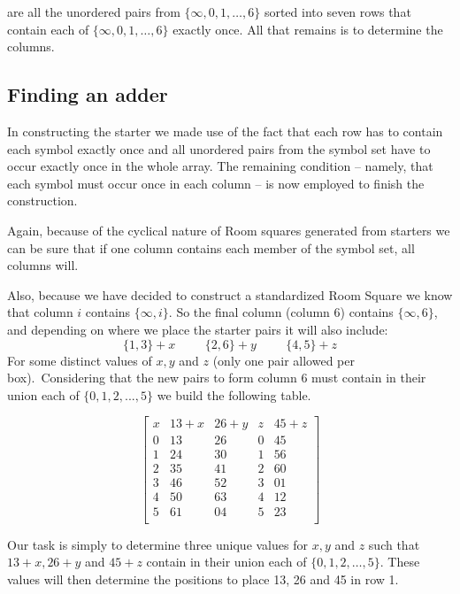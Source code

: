 \documentclass[11pt, a4paper]{book}\usepackage[]{graphicx}\usepackage[]{xcolor}
\begin{document}
are all the unordered pairs from $\{\infty, 0, 1, \ldots, 6\}$
sorted into seven rows that contain each of
$\{\infty, 0, 1, \ldots, 6\}$ exactly once. All that remains is to
determine the columns.

\subsection{Finding an adder}

In constructing the starter we made use of the fact that
each row has to contain each symbol exactly once and all
unordered pairs from the symbol set have to occur exactly
once in the whole array. The remaining condition – namely,
that each symbol must occur once in each column – is now
employed to finish the construction.

Again, because of the cyclical nature of Room squares
generated from starters we can be sure that if one column
contains each member of the symbol set, all columns will.

Also, because we have decided to construct a standardized
Room Square we know that column $i$ contains $\{\infty,i\}$.
So the final column (column 6) contains $\{\infty,6\}$, and
depending on where we place the starter pairs it will also
include: $$\{1,3\}+x \hspace{1cm} \{2,6\}+y \hspace{1cm}
\{4,5\}+z$$ For some distinct values of $x,y$ and $z$ (only
one pair allowed per box).\ Considering that the new pairs
to form column 6 must contain in their union each of
$\{0,1,2,...,5\}$ we build the following table.

\begin{equation}
  \begin{bmatrix}
    x &  13 + x & 26 + y & z & 45 + z \\
    0 &    13   &   26   & 0 &   45   \\
    1 &    24   &   30   & 1 &   56   \\
    2 &    35   &   41   & 2 &   60   \\
    3 &    46   &   52   & 3 &   01   \\
    4 &    50   &   63   & 4 &   12   \\
    5 &    61   &   04   & 5 &   23   \\
  \end{bmatrix}
  \label{eq:adder}
\end{equation}

Our task is simply to determine three unique values for $x,
y$ and $z$ such that $13 + x, 26 + y$ and $45 + z$ contain
in their union each of $\{0, 1, 2, \ldots, 5\}$. These
values will then determine the positions to place 13, 26 and
45 in row 1.
\end{document}
